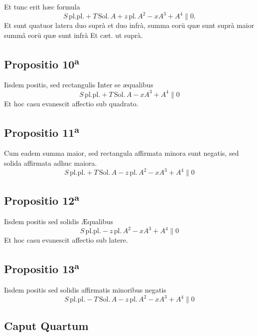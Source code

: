 \documentclass[11pt,a4paper]{article}
\begin{document}
Et tunc erit hæc formula
\[ S\,\mathrm{pl.pl.} + T\,\mathrm{Sol.}\,A + z\,\mathrm{pl.}\,A^{2} - xA^{3} + A^{4} \parallel 0. \]
Et sunt quatuor latera duo suprà et duo infrà, summa eorū quæ sunt suprà maior summâ eorū quæ sunt infrà Et cæt. ut suprà.

\subsection*{Propositio 10\textsuperscript{a}}

Iisdem positis, sed rectangulis Inter se æqualibus
\[ S\,\mathrm{pl.pl.} + T\,\mathrm{Sol.}\,A - xA^{3} + A^{4} \parallel 0 \]
Et hoc casu evanescit affectio sub quadrato.

\subsection*{Propositio 11\textsuperscript{a}}

Cum eadem summa maior, sed rectangula affirmata minora sunt negatis, sed solida affirmata adhuc maiora.
\[ S\,\mathrm{pl.pl.} + T\,\mathrm{Sol.}\,A - z\,\mathrm{pl.}\,A^{2} - xA^{3} + A^{4} \parallel 0 \]

\subsection*{Propositio 12\textsuperscript{a}}

Iisdem positis sed solidis Æqualibus
\[ S\,\mathrm{pl.pl.} - z\,\mathrm{pl.}\,A^{2} - xA^{3} + A^{4} \parallel 0 \]
Et hoc casu evanescit affectio sub latere.

\subsection*{Propositio 13\textsuperscript{a}}

Iisdem positis sed solidis affirmatis minoribus negatis
\[ S\,\mathrm{pl.pl.} - T\,\mathrm{Sol.}\,A - z\,\mathrm{pl.}\,A^{2} - xA^{3} + A^{4} \parallel 0 \]

\subsection*{Caput Quartum}
\end{document}

